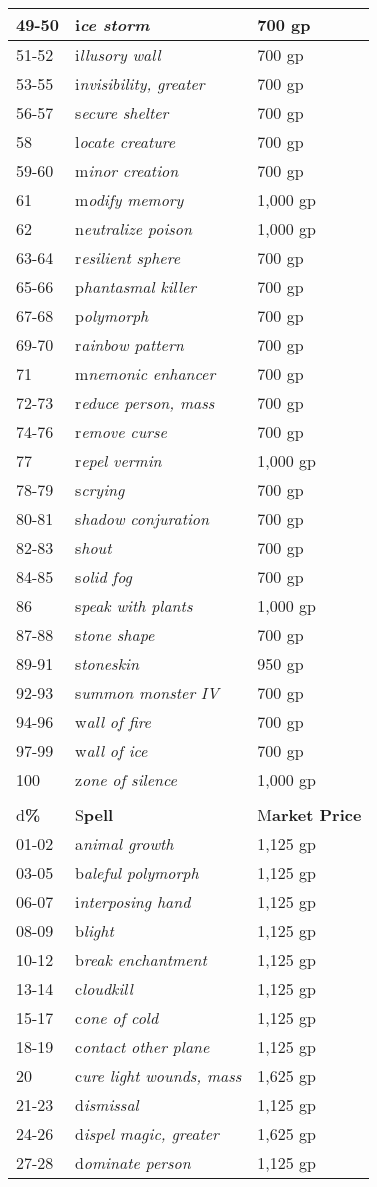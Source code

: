 \documentclass{article}
\begin{document}
\begin{tabular}{|>{\raggedright}p{28pt}|>{\raggedright}p{200pt}|>{\raggedright}p{85pt}|}
\hline
49-50 & i\textit{ce storm} & 700 gp\tabularnewline
\hline
51-52 & i\textit{llusory wall} & 700 gp\tabularnewline
\hline
53-55 & i\textit{nvisibility, greater} & 700 gp\tabularnewline
\hline
56-57 & s\textit{ecure shelter} & 700 gp\tabularnewline
\hline
58 & l\textit{ocate creature} & 700 gp\tabularnewline
\hline
59-60 & m\textit{inor creation} & 700 gp\tabularnewline
\hline
61 & m\textit{odify memory} & 1,000 gp\tabularnewline
\hline
62 & n\textit{eutralize poison} & 1,000 gp\tabularnewline
\hline
63-64 & r\textit{esilient sphere} & 700 gp\tabularnewline
\hline
65-66 & p\textit{hantasmal killer} & 700 gp\tabularnewline
\hline
67-68 & p\textit{olymorph} & 700 gp\tabularnewline
\hline
69-70 & r\textit{ainbow pattern} & 700 gp\tabularnewline
\hline
71 & m\textit{nemonic enhancer} & 700 gp\tabularnewline
\hline
72-73 & r\textit{educe person, mass} & 700 gp\tabularnewline
\hline
74-76 & r\textit{emove curse} & 700 gp\tabularnewline
\hline
77 & r\textit{epel vermin} & 1,000 gp\tabularnewline
\hline
78-79 & s\textit{crying} & 700 gp\tabularnewline
\hline
80-81 & s\textit{hadow conjuration} & 700 gp\tabularnewline
\hline
82-83 & s\textit{hout} & 700 gp\tabularnewline
\hline
84-85 & s\textit{olid fog} & 700 gp\tabularnewline
\hline
86 & s\textit{peak with plants} & 1,000 gp\tabularnewline
\hline
87-88 & s\textit{tone shape} & 700 gp\tabularnewline
\hline
89-91 & s\textit{toneskin} & 950 gp\tabularnewline
\hline
92-93 & s\textit{ummon monster IV} & 700 gp\tabularnewline
\hline
94-96 & w\textit{all of fire} & 700 gp\tabularnewline
\hline
97-99 & w\textit{all of ice} & 700 gp\tabularnewline
\hline
100 & z\textit{one of silence} & 1,000 gp\tabularnewline
\hline
\multicolumn{3}{|p{314pt}|}{5\textit{\textbf{th-Level Arcane Spells}}}\tabularnewline
\hline
d\textbf{\%} & S\textbf{pell} & M\textbf{arket Price}\tabularnewline
\hline
01-02 & a\textit{nimal growth} & 1,125 gp\tabularnewline
\hline
03-05 & b\textit{aleful polymorph} & 1,125 gp\tabularnewline
\hline
06-07 & i\textit{nterposing hand} & 1,125 gp\tabularnewline
\hline
08-09 & b\textit{light} & 1,125 gp\tabularnewline
\hline
10-12 & b\textit{reak enchantment} & 1,125 gp\tabularnewline
\hline
13-14 & c\textit{loudkill} & 1,125 gp\tabularnewline
\hline
15-17 & c\textit{one of cold} & 1,125 gp\tabularnewline
\hline
18-19 & c\textit{ontact other plane} & 1,125 gp\tabularnewline
\hline
20 & c\textit{ure light wounds, mass} & 1,625 gp\tabularnewline
\hline
21-23 & d\textit{ismissal} & 1,125 gp\tabularnewline
\hline
24-26 & d\textit{ispel magic, greater} & 1,625 gp\tabularnewline
\hline
27-28 & d\textit{ominate person} & 1,125 gp\tabularnewline

\end{tabular}
\end{document}
